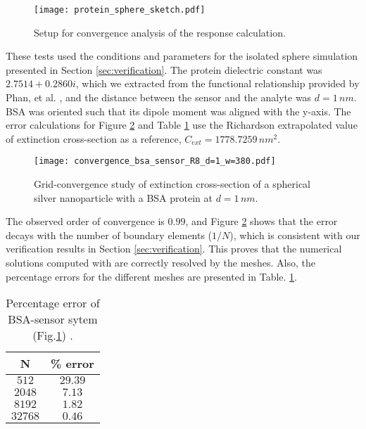 \begin{figure}[h] %
   \centering
   \texttt{[image: protein\_sphere\_sketch.pdf]} 
   \caption{Setup for convergence analysis of the response calculation.}
   \label{fig:setup_conv}
\end{figure}

These tests used the conditions and parameters for the isolated sphere simulation
presented in Section \ref{sec:verification}. The protein dielectric constant was
$2.7514 + 0.2860i$, which we extracted from the 
functional relationship provided by Phan, et al. \cite{PhanETal2013}, and the 
distance between the sensor and the analyte was $d=1 \, nm$. BSA was oriented such that
its dipole moment was aligned with the y-axis. The error calculations for Figure \ref{fig:error_sphere-bsa}
and Table \ref{table:err_bsa_sensor} use the Richardson extrapolated value of extinction cross-section as a
reference, $C_{ext}= 1778.7259 \, nm^2$.


\begin{figure}[h] %
   \centering
   \texttt{[image: convergence\_bsa\_sensor\_R8\_d=1\_w=380.pdf]} 
   \caption{Grid-convergence study of extinction cross-section of a spherical silver
            nanoparticle with a BSA protein at $d=1 \, nm$.}
   \label{fig:error_sphere-bsa}
\end{figure}

The observed order of convergence is $0.99$, and 
Figure \ref{fig:error_sphere-bsa} shows that the error decays with the number
of boundary elements ($1/N$), which is consistent with our verification 
results in Section \ref{sec:verification}. This proves that the
numerical solutions computed with \pygbe are correctly resolved by the meshes.
Also, the percentage errors for the different meshes are presented in Table. \ref{table:err_bsa_sensor}.

\begin{table}[h]
    \centering
    \caption{\label{table:err_bsa_sensor} Percentage error of BSA-sensor sytem (Fig.\ref{fig:setup_conv}) .} 
    \begin{tabular}{c c}
    \hline%
    N & \% error \\
    \hline%
     $512$ & $29.39$ \\
     $2048$ & $7.13$ \\
     $8192$ & $1.82$ \\
     $32768$ & $0.46$ \\
    \hline%
    \end{tabular}
\end{table}

